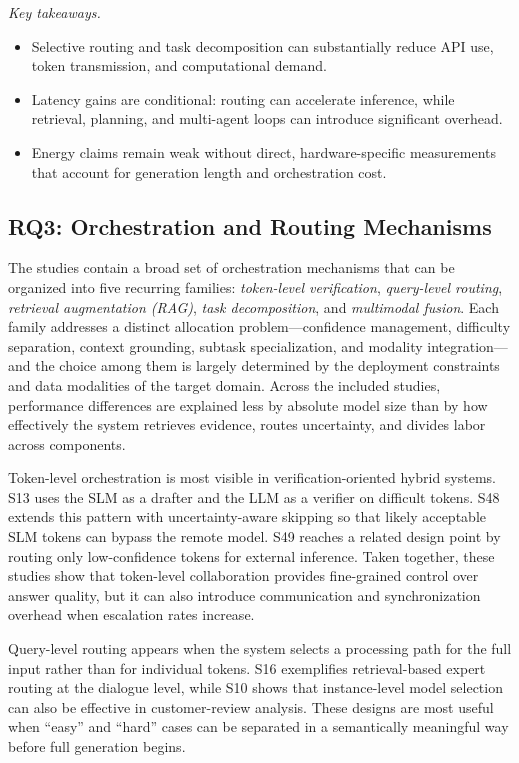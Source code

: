 \begin{samepage}
\smallskip\noindent\textit{Key takeaways.}
\begin{itemize}
    \item Selective routing and task decomposition can substantially reduce API use, token transmission, and computational demand.
    \item Latency gains are conditional: routing can accelerate inference, while retrieval, planning, and multi-agent loops can introduce significant overhead.
    \item Energy claims remain weak without direct, hardware-specific measurements that account for generation length and orchestration cost.
\end{itemize}
\end{samepage}

\subsection{RQ3: Orchestration and Routing Mechanisms}
\label{sec:rq3}
The studies contain a broad set of orchestration mechanisms that can be organized into five recurring families: \textit{token-level verification}, \textit{query-level routing}, \textit{retrieval augmentation (RAG)}, \textit{task decomposition}, and \textit{multimodal fusion}. Each family addresses a distinct allocation problem---confidence management, difficulty separation, context grounding, subtask specialization, and modality integration---and the choice among them is largely determined by the deployment constraints and data modalities of the target domain. Across the included studies, performance differences are explained less by absolute model size than by how effectively the system retrieves evidence, routes uncertainty, and divides labor across components.

Token-level orchestration is most visible in verification-oriented hybrid systems. S13 uses the SLM as a drafter and the LLM as a verifier on difficult tokens. S48 extends this pattern with uncertainty-aware skipping so that likely acceptable SLM tokens can bypass the remote model. S49 reaches a related design point by routing only low-confidence tokens for external inference. Taken together, these studies show that token-level collaboration provides fine-grained control over answer quality, but it can also introduce communication and synchronization overhead when escalation rates increase.

Query-level routing appears when the system selects a processing path for the full input rather than for individual tokens. S16 exemplifies retrieval-based expert routing at the dialogue level, while S10 shows that instance-level model selection can also be effective in customer-review analysis. These designs are most useful when ``easy'' and ``hard'' cases can be separated in a semantically meaningful way before full generation begins.

